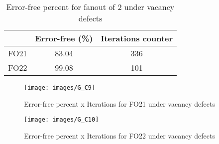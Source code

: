\begin{table}[h]
\begin{center}
\caption{Error-free percent for fanout of 2 under vacancy defects}
\begin{tabular}{|c|c|c|}
\hline
 & Error-free (\%) & Iterations counter \\
\hline
 FO21 & 83.04 & 336 \\
\hline
 FO22 & 99.08 & 101 \\
\hline

\end{tabular}
\end{center}
\end{table}

\begin{figure}[h!]
\center
\texttt{[image: images/G\_C9]}
\caption{Error-free percent x Iterations for FO21 under vacancy defects}
\label{figure:fanout2_reg_gt5}
\end{figure}

\begin{figure}[h!]
\center
\texttt{[image: images/G\_C10]}
\caption{Error-free percent x Iterations for FO22 under vacancy defects}
\label{figure:fanout2_mod_gt5}
\end{figure}
\pagebreak